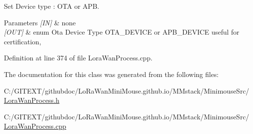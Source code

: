 Set Device type \+: O\+TA or A\+PB. 


\begin{DoxyParams}{Parameters}
{\em \mbox{[}\+I\+N\mbox{]}} & none \\
\hline
{\em \mbox{[}\+O\+U\+T\mbox{]}} & enum Ota Device Type O\+T\+A\+\_\+\+D\+E\+V\+I\+CE or A\+P\+B\+\_\+\+D\+E\+V\+I\+CE useful for certification, \\
\hline
\end{DoxyParams}


Definition at line 374 of file Lora\+Wan\+Process.\+cpp.



The documentation for this class was generated from the following files\+:\begin{DoxyCompactItemize}
\item 
C\+:/\+G\+I\+T\+E\+X\+T/githubdoc/\+Lo\+Ra\+Wan\+Mini\+Mouse.\+github.\+io/\+M\+Mstack/\+Minimouse\+Src/\mbox{\hyperlink{_lora_wan_process_8h}{Lora\+Wan\+Process.\+h}}\item 
C\+:/\+G\+I\+T\+E\+X\+T/githubdoc/\+Lo\+Ra\+Wan\+Mini\+Mouse.\+github.\+io/\+M\+Mstack/\+Minimouse\+Src/\mbox{\hyperlink{_lora_wan_process_8cpp}{Lora\+Wan\+Process.\+cpp}}\end{DoxyCompactItemize}

